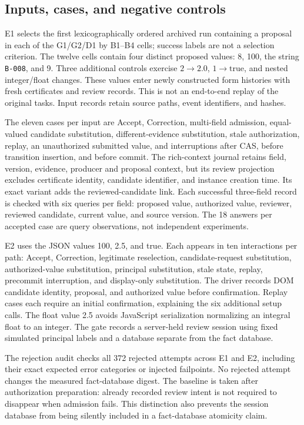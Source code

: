 \documentclass[11pt,a4paper]{article}
\newcommand{\code}[1]{\nolinkurl{#1}}
\begin{document}
\subsection{Inputs, cases, and negative controls}

E1 selects the first lexicographically ordered archived run containing a proposal in each of the G1/G2/D1 by B1--B4 cells; success labels are not a selection criterion. The twelve cells contain four distinct proposed values: 8, 100, the string \code{B-008}, and 9. Three additional controls exercise $2\rightarrow2.0$, $1\rightarrow\mathrm{true}$, and nested integer/float changes. These values enter newly constructed form histories with fresh certificates and review records. This is not an end-to-end replay of the original tasks. Input records retain source paths, event identifiers, and hashes.

The eleven cases per input are Accept, Correction, multi-field admission, equal-valued candidate substitution, different-evidence substitution, stale authorization, replay, an unauthorized submitted value, and interruptions after CAS, before transition insertion, and before commit. The rich-context journal retains field, version, evidence, producer and proposal context, but its review projection excludes certificate identity, candidate identifier, and instance creation time. Its exact variant adds the reviewed-candidate link. Each successful three-field record is checked with six queries per field: proposed value, authorized value, reviewer, reviewed candidate, current value, and source version. The 18 answers per accepted case are query observations, not independent experiments.

E2 uses the JSON values 100, 2.5, and true. Each appears in ten interactions per path: Accept, Correction, legitimate reselection, candidate-request substitution, authorized-value substitution, principal substitution, stale state, replay, precommit interruption, and display-only substitution. The driver records DOM candidate identity, proposal, and authorized value before confirmation. Replay cases each require an initial confirmation, explaining the six additional setup calls. The float value 2.5 avoids JavaScript serialization normalizing an integral float to an integer. The gate records a server-held review session using fixed simulated principal labels and a database separate from the fact database.

The rejection audit checks all 372 rejected attempts across E1 and E2, including their exact expected error categories or injected failpoints. No rejected attempt changes the measured fact-database digest. The baseline is taken after authorization preparation: already recorded review intent is not required to disappear when admission fails. This distinction also prevents the session database from being silently included in a fact-database atomicity claim.
\end{document}
